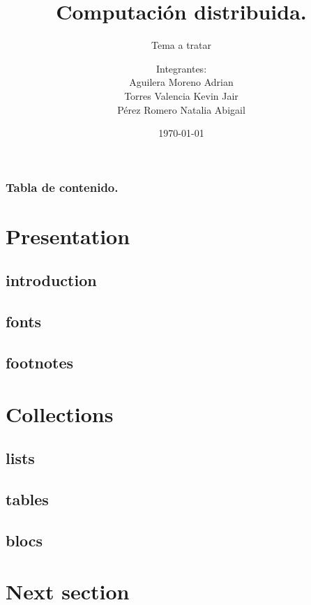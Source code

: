 \documentclass[9pt]{beamer}
\title{Computación distribuida.}
\subtitle{Tema a tratar}
\author{Integrantes:\\
        Aguilera Moreno Adrian\\
        Torres Valencia Kevin Jair\\
        Pérez Romero Natalia Abigail}
\institute{Facultad de Ciencias, UNAM}
\date{\today}
\begin{document}
\titlepage

\begin{frame}
 \frametitle{Tabla de contenido.}
 \tableofcontents
\end{frame}

\section{Presentation}

\subsection{introduction}



\def\beamer@mytheme@style{green}


\subsection{fonts}


\subsection{footnotes}



\section{Collections}

\subsection{lists}


\subsection{tables}


\subsection{blocs}








\section{Next section}
\end{document}
